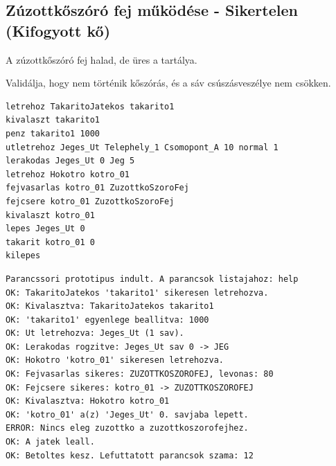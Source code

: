 \subsection{Zúzottkőszóró fej működése - Sikertelen (Kifogyott kő)}
\begin{test-case-description}
    A zúzottkőszóró fej halad, de üres a tartálya.
\end{test-case-description}
\begin{test-case-function}
    Validálja, hogy nem történik kőszórás, és a sáv csúszásveszélye nem csökken.
\end{test-case-function}
\begin{test-case-input}
\begin{verbatim}
letrehoz TakaritoJatekos takarito1
kivalaszt takarito1
penz takarito1 1000
utletrehoz Jeges_Ut Telephely_1 Csomopont_A 10 normal 1
lerakodas Jeges_Ut 0 Jeg 5
letrehoz Hokotro kotro_01
fejvasarlas kotro_01 ZuzottkoSzoroFej
fejcsere kotro_01 ZuzottkoSzoroFej
kivalaszt kotro_01
lepes Jeges_Ut 0
takarit kotro_01 0
kilepes
\end{verbatim}
\end{test-case-input}
\begin{test-case-output}
\begin{verbatim}
Parancssori prototipus indult. A parancsok listajahoz: help
OK: TakaritoJatekos 'takarito1' sikeresen letrehozva.
OK: Kivalasztva: TakaritoJatekos takarito1
OK: 'takarito1' egyenlege beallitva: 1000
OK: Ut letrehozva: Jeges_Ut (1 sav).
OK: Lerakodas rogzitve: Jeges_Ut sav 0 -> JEG
OK: Hokotro 'kotro_01' sikeresen letrehozva.
OK: Fejvasarlas sikeres: ZUZOTTKOSZOROFEJ, levonas: 80
OK: Fejcsere sikeres: kotro_01 -> ZUZOTTKOSZOROFEJ
OK: Kivalasztva: Hokotro kotro_01
OK: 'kotro_01' a(z) 'Jeges_Ut' 0. savjaba lepett.
ERROR: Nincs eleg zuzottko a zuzottkoszorofejhez.
OK: A jatek leall.
OK: Betoltes kesz. Lefuttatott parancsok szama: 12
\end{verbatim}
\end{test-case-output}

